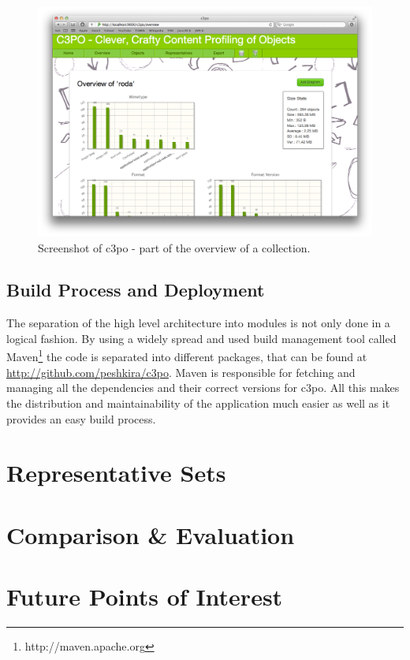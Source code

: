 \begin{figure}[htb]
\begin{center}
\includegraphics[width=5.5in]{figures/architecture/web_app_overview}
\caption{Screenshot of c3po - part of the overview of a collection.}
\label{fig:web_app_overview}
\end{center}
\end{figure}


\subsection{Build Process and Deployment}
The separation of the high level architecture into modules is not only done in a logical fashion. By using a widely spread and used build management tool called Maven\footnote{http://maven.apache.org} the code is separated into different packages, that can be found at \url{http://github.com/peshkira/c3po}. Maven is responsible for fetching and managing all the dependencies and their correct versions for c3po.
All this makes the distribution and maintainability of the application much easier as well as it provides an easy build process.

\section{Representative Sets}

\section{Comparison \& Evaluation}

\section{Future Points of Interest}
